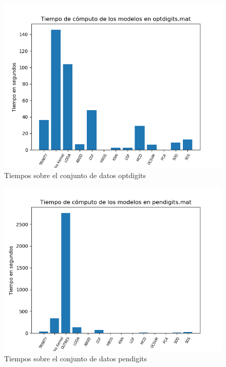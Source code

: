 \begin{figure}[H]
	\centering
	\label{optdigits_times}
	\includegraphics[scale=0.7]{imagenes/imgs-exp1/times/optdigits}
	\caption{Tiempos sobre el conjunto de datos optdigits}
\end{figure}

\begin{figure}[H]
	\centering
	\label{pendigits_times}
	\includegraphics[scale=0.7]{imagenes/imgs-exp1/times/pendigits}
	\caption{Tiempos sobre el conjunto de datos pendigits}
\end{figure}

